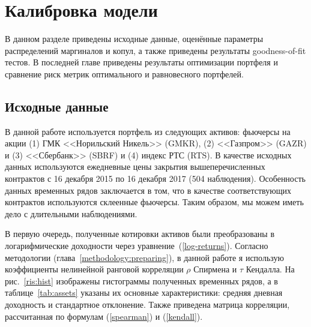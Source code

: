 \newpage

\section{Калибровка модели}
\label{section:calibration}

В данном разделе приведены исходные данные, оценённые параметры распределений маргиналов и копул, а также приведены результаты goodness-of-fit тестов. В последней главе приведены результаты оптимизации портфеля и сравнение риск метрик оптимального и равновесного портфелей.

\subsection{Исходные данные}

В данной работе используется портфель из следующих активов: фьючерсы на акции (1) ГМК <<Норильский Никель>> (GMKR), (2) <<Газпром>> (GAZR) и (3) <<Сбербанк>> (SBRF) и (4) индекс РТС (RTS). 
В качестве исходных данных используются ежедневные цены закрытия вышеперечисленных контрактов с 16 декабря 2015 по 16 декабря 2017 (504 наблюдения). 
Особенность данных временных рядов заключается в том, что в качестве соответствующих контрактов используются склеенные фьючерсы.
Таким образом, мы можем иметь дело с длительными наблюдениями. 

В первую очередь, полученные котировки активов были преобразованы в логарифмические доходности через уравнение~(\ref{log-returns}).
Согласно методологии (глава~\ref{methodology:preparing}), в данной работе я использую коэффициенты нелинейной ранговой корреляции $\rho$ Спирмена и $\tau$ Кендалла.
На рис.~\ref{ris:hist} изображены гистограммы полученных временных рядов, а в таблице~\ref{tab:assets} указаны их основные характеристики: средняя дневная доходность и стандартное отклонение. 
Также приведена матрица корреляции, рассчитанная по формулам (\ref{spearman}) и (\ref{kendall}).

